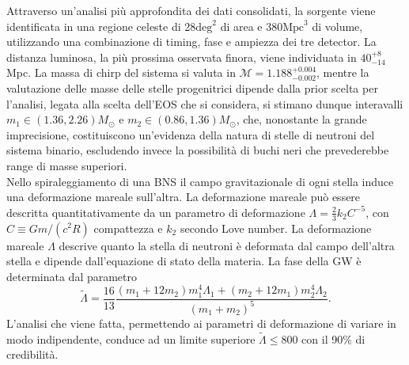 Attraverso un'analisi più approfondita dei dati consolidati, la sorgente viene identificata in una regione celeste di 28$\text{deg}^2$ di area e $380\text{Mpc}^3$ di volume, utilizzando una combinazione di timing, fase e ampiezza dei tre detector. La distanza luminosa, la più prossima osservata finora, viene individuata in $40_{-14}^{+8}$Mpc. La massa di chirp del sistema si valuta in $\mathcal{M}=1.188_{-0.002}^{+0.004}$, mentre la valutazione delle masse delle stelle progenitrici dipende dalla prior scelta per l'analisi, legata alla scelta dell'EOS che si considera, si stimano dunque interavalli $m_1 \in (1.36, 2.26)M_\odot$ e $m_2 \in (0.86, 1.36)M_\odot$, che, nonostante la grande imprecisione, costituiscono un'evidenza della natura di stelle di neutroni del sistema binario, escludendo invece la possibilità di buchi neri che prevederebbe range di masse superiori\cite{Abbott_2017a}.\\
Nello spiraleggiamento di una BNS il campo gravitazionale di ogni stella induce una deformazione mareale sull'altra.
La deformazione mareale può essere descritta quantitativamente da un parametro di deformazione
$\Lambda=\frac{2}{3}k_2C^{-5}$,
con $C\equiv Gm/(c^2R)$ compattezza e $k_2$ secondo Love number. 
La deformazione mareale $\Lambda$ descrive quanto la stella di neutroni è deformata dal campo dell'altra stella e dipende dall'equazione di stato della materia. La fase della GW è determinata dal parametro \[\tilde{\Lambda} = \frac{16}{13}\frac{(m_1+12m_2)m_1^4\Lambda_1+(m_2+12m_1)m_2^4\Lambda_2}{(m_1+m_2)^5}.\]
L'analisi che viene fatta, permettendo ai parametri di deformazione di variare in modo indipendente, conduce ad un limite superiore $\tilde{\Lambda} \leq800$ con il 90\% di credibilità\cite{Abbott_2017a}.


